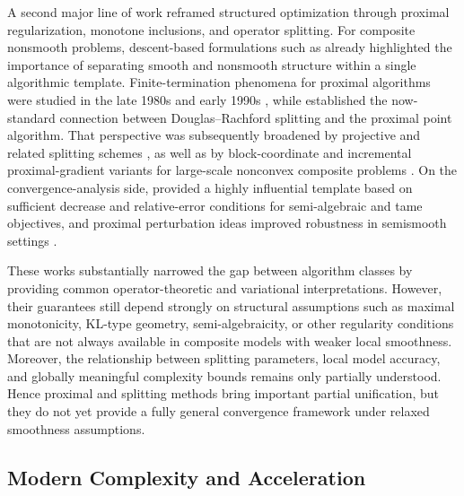 \documentclass[11pt]{article}
\begin{document}
A second major line of work reframed structured optimization through proximal regularization, monotone inclusions, and operator splitting. For composite nonsmooth problems, descent-based formulations such as \citet{burke1985descent} already highlighted the importance of separating smooth and nonsmooth structure within a single algorithmic template. Finite-termination phenomena for proximal algorithms were studied in the late 1980s and early 1990s \citep{ferris1991finite}, while \citet{eckstein1992douglas} established the now-standard connection between Douglas--Rachford splitting and the proximal point algorithm. That perspective was subsequently broadened by projective and related splitting schemes \citep{eckstein2007projective,fukushima1996primal}, as well as by block-coordinate and incremental proximal-gradient variants for large-scale nonconvex composite problems \citep{necoara2021block}. On the convergence-analysis side, \citet{attouch2013convergence} provided a highly influential template based on sufficient decrease and relative-error conditions for semi-algebraic and tame objectives, and proximal perturbation ideas improved robustness in semismooth settings \citep{billups2000robustness}.

These works substantially narrowed the gap between algorithm classes by providing common operator-theoretic and variational interpretations. However, their guarantees still depend strongly on structural assumptions such as maximal monotonicity, KL-type geometry, semi-algebraicity, or other regularity conditions that are not always available in composite models with weaker local smoothness. Moreover, the relationship between splitting parameters, local model accuracy, and globally meaningful complexity bounds remains only partially understood. Hence proximal and splitting methods bring important partial unification, but they do not yet provide a fully general convergence framework under relaxed smoothness assumptions.

\subsection{Modern Complexity and Acceleration}
\end{document}
